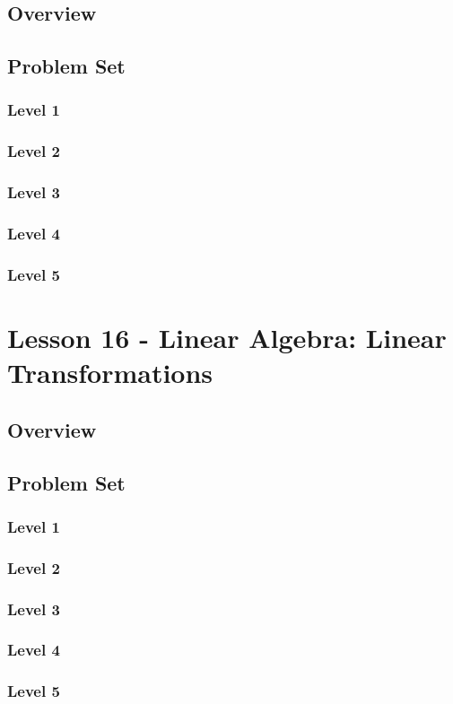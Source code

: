 \documentclass{article}
\begin{document}
\subsection{Overview}
\subsection{Problem Set}
\subsubsection{Level 1}
\subsubsection{Level 2}
\subsubsection{Level 3}
\subsubsection{Level 4}
\subsubsection{Level 5}
\pagebreak

\section{Lesson 16 - Linear Algebra: Linear Transformations}
\subsection{Overview}
\subsection{Problem Set}
\subsubsection{Level 1}
\subsubsection{Level 2}
\subsubsection{Level 3}
\subsubsection{Level 4}
\subsubsection{Level 5}
\pagebreak
\end{document}
